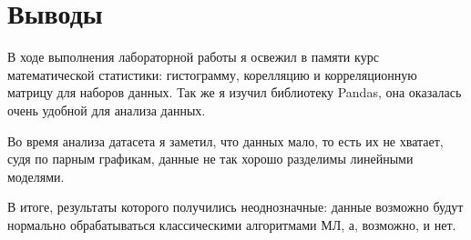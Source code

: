 \section{Выводы}
В ходе выполнения лабораторной работы я освежил в памяти курс математической статистики: гистограмму, корелляцию и корреляционную матрицу 
для наборов данных. Так же я изучил библиотеку Pandas, она оказалась очень удобной для анализа данных.

Во время анализа датасета я заметил, что данных мало, то есть их не хватает, судя по парным графикам, данные не так хорошо разделимы
линейными моделями.

В итоге, результаты которого получились неоднозначные: данные возможно будут нормально обрабатываться
классическими алгоритмами МЛ, а, возможно, и нет. 
\pagebreak
